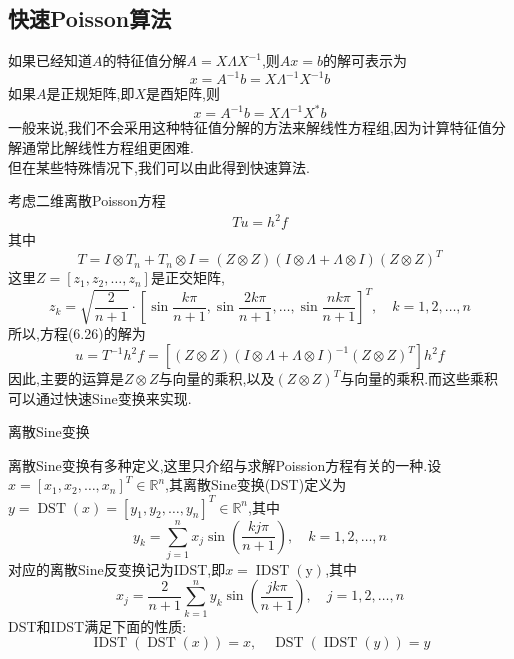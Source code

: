 \documentclass[notheorems,serif]{beamer}
\renewcommand{\normalsize}{\wuhao}
\newcommand{\wuhao}{\fontsize{10.5pt}{\baselineskip}\selectfont}
\begin{document}
\subsection{快速Poisson算法}
\begin{frame}
如果已经知道$A$的特征值分解$A=X \Lambda X^{-1}$,则$Ax=b$的解可表示为
$$
x=A^{-1} b=X \Lambda^{-1} X^{-1} b
$$
如果$A$是正规矩阵,即$X$是酉矩阵,则
$$
x=A^{-1} b=X \Lambda^{-1} X^{*} b
$$
一般来说,我们不会采用这种特征值分解的方法来解线性方程组,因为计算特征值分解通常比解线性方程组更困难.\\
但在某些特殊情况下,我们可以由此得到快速算法.\\
\end{frame}

\begin{frame}
考虑二维离散Poisson方程
\begin{align*}
T u=h^{2} f
\tag{6.26}
\end{align*}
其中
$$
T=I \otimes T_{n}+T_{n} \otimes I=(Z \otimes Z)(I \otimes \Lambda+\Lambda \otimes I)(Z \otimes Z)^{T}
$$
这里$Z=\left[z_{1}, z_{2}, \ldots, z_{n}\right]$是正交矩阵,
$$
z_{k}=\sqrt{\frac{2}{n+1}} \cdot\left[\sin \frac{k \pi}{n+1}, \sin \frac{2 k \pi}{n+1}, \ldots, \sin \frac{n k \pi}{n+1}\right]^{T}, \quad k=1,2, \ldots, n
$$
所以,方程(6.26)的解为
$$
u=T^{-1} h^{2} f=\left[(Z \otimes Z)(I \otimes \Lambda+\Lambda \otimes I)^{-1}(Z \otimes Z)^{T}\right] h^{2} f
$$
因此,主要的运算是$Z \otimes Z$与向量的乘积,以及$(Z \otimes Z)^{T}$与向量的乘积.而这些乘积可以通过快速Sine变换来实现.\\
\end{frame}

\begin{frame}


{\color{blue}\Large 离散Sine变换}

\quad

\normalsize
离散Sine变换有多种定义,这里只介绍与求解Poission方程有关的一种.设$x=\left[x_{1}, x_{2}, \ldots, x_{n}\right]^{T} \in \mathbb{R}^{n}$,其{\color{blue}离散Sine变换(DST)}定义为$y=\operatorname{DST}(x)=\left[y_{1}, y_{2}, \ldots, y_{n}\right]^{T} \in \mathbb{R}^{n}$,其中
$$
y_{k}=\sum_{j=1}^{n} x_{j} \sin \left(\frac{k j \pi}{n+1}\right), \quad k=1,2, \ldots, n
$$
对应的离散Sine反变换记为IDST,即$x=\operatorname{IDST}(\mathrm{y})$,其中  
$$
x_{j}=\frac{2}{n+1} \sum_{k=1}^{n} y_{k} \sin \left(\frac{j k \pi}{n+1}\right), \quad j=1,2, \ldots, n
$$
DST和IDST满足下面的性质:
$$
\operatorname{IDST}(\operatorname{DST}(x))=x, \quad \operatorname{DST}(\operatorname{IDST}(y))=y
$$
\end{frame}
\end{document}
